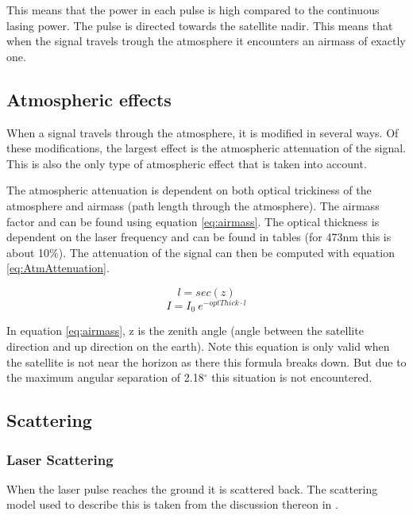 This means that the power in each pulse is high compared to the continuous lasing power. The pulse is directed towards the satellite nadir. This means that when the signal travels trough the atmosphere it encounters an airmass of exactly one.

\subsection{Atmospheric effects}

When a signal travels through the atmosphere, it is modified in several ways. Of these modifications, the largest effect is the atmospheric attenuation of the signal. This is also the only type of atmospheric effect that is taken into account.

The atmospheric attenuation is dependent on both optical trickiness of the atmosphere and airmass (path length through the atmosphere). The airmass factor and can be found using equation \ref{eq:airmass}. The optical thickness is dependent on the laser frequency and can be found in tables (for 473nm this is about 10\%). The attenuation of the signal can then be computed with equation \ref{eq:AtmAttenuation}.

\begin{equation}
	l = sec (z)
	\label{eq:airmass}
\end{equation}
\begin{equation}
	I = I_0 \: e^{ -optThick \cdot l }
	\label{eq:AtmAttenuation}
\end{equation}

In equation \ref{eq:airmass}, z is the zenith angle (angle between the satellite direction and up direction on the earth). Note this equation is only valid when the satellite is not near the horizon as there this formula breaks down. But due to the maximum angular separation of 2.18$^\circ$ this situation is not encountered.

\subsection{Scattering}
\subsubsection{Laser Scattering}
\label{scatter}
When the laser pulse reaches the ground it is scattered back. The scattering model used to describe this is taken from the discussion thereon in \cite{rees}. 

